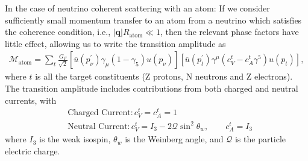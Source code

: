 In the case of neutrino coherent scattering with an atom: If we consider sufficiently small momentum transfer to an atom from a neutrino which satisfies the coherence condition, i.e., $|\mathbf{q}|R_{\mathrm{atom}}\ll1$, then the relevant phase factors have little effect, allowing us to write the transition amplitude as \cite{Nicolescu:2013rxa}
\begin{align}
\label{M_atom}
\mathcal{M}_\mathrm{atom}=\sum_t\frac{G_F}{\sqrt{2}}\left[\overline{u}(p^\prime_\nu)\gamma_\mu\left(1-\gamma_5\right)u(p_\nu)\right]\left[\overline{u}(p^\prime_t)\gamma^\mu\left(c^t_V-c^t_A\gamma^5\right)u(p_t)\right],
\end{align}
where $t$ is all the target constituents (Z protons, N neutrons and Z electrons). The transition amplitude includes contributions from both charged and neutral currents, with
\begin{align}\label{CC_int}
&\mathrm{Charged\,\,Current}: c^t_V=c^t_A=1\\
\label{NC_int}
&\mathrm{Neutral\,\, Current}: c^t_V=I_3-2\mathcal{Q}\sin^2\theta_w,\qquad c^t_A=I_3
\end{align}
where $I_3$ is the weak isospin, $\theta_w$ is the Weinberg angle, and $\mathcal{Q}$ is the particle electric charge. 


